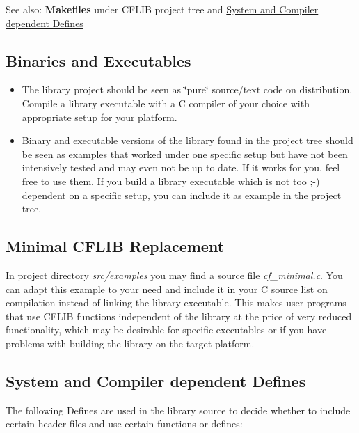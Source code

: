 \begin{Desc}
\item[See also:]{\bf Makefiles} under CFLIB project tree and \hyperlink{development_compilation_options}{System and Compiler dependent Defines}\end{Desc}
\hypertarget{development_binaries}{}\subsection{Binaries and Executables}\label{development_binaries}
\begin{itemize}
\item The library project should be seen as \char`\"{}pure\char`\"{} source/text code on distribution. Compile a library executable with a C compiler of your choice with appropriate setup for your platform.\end{itemize}


\begin{itemize}
\item Binary and executable versions of the library found in the project tree should be seen as examples that worked under one specific setup but have not been intensively tested and may even not be up to date. If it works for you, feel free to use them. If you build a library executable which is not too ;-) dependent on a specific setup, you can include it as example in the project tree.\end{itemize}
\hypertarget{development_minimal_replacement}{}\subsection{Minimal CFLIB Replacement}\label{development_minimal_replacement}
In project directory {\em src/examples\/} you may find a source file {\em cf\_\-minimal.c\/}. You can adapt this example to your need and include it in your C source list on compilation instead of linking the library executable. This makes user programs that use CFLIB functions independent of the library at the price of very reduced functionality, which may be desirable for specific executables or if you have problems with building the library on the target platform.\hypertarget{development_compilation_options}{}\subsection{System and Compiler dependent Defines}\label{development_compilation_options}
The following Defines are used in the library source to decide whether to include certain header files and use certain functions or defines:

